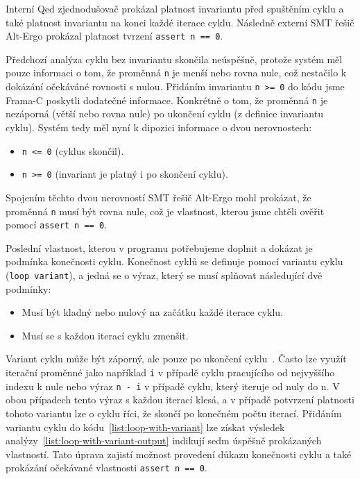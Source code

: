 Interní Qed zjednodušovač prokázal platnost invariantu před spuštěním cyklu a také platnost invariantu na konci každé iterace cyklu.
Následně externí SMT řešič Alt-Ergo prokázal platnost tvrzení \texttt{assert n == 0}.

Předchozí analýza cyklu bez invariantu skončila neúspěšně,
protože systém měl pouze informaci o tom, že proměnná \texttt{n} je menší nebo rovna nule,
což nestačilo k dokázání očekáváné rovnosti s nulou.
Přidáním invariantu \texttt{n~>=~0} do kódu jsme Frama\mbox{-}C poskytli dodatečné informace.
Konkrétně o tom, že proměnná \texttt{n} je nezáporná (větší nebo rovna nule) po ukončení cyklu (z definice invariantu cyklu).
Systém tedy měl nyní k dipozici informace o dvou nerovnostech:

\begin{itemize}
    \item \texttt{n <= 0} (cyklus skončil).
    \item \texttt{n >= 0} (invariant je platný i po skončení cyklu).
\end{itemize}

Spojením těchto dvou nerovností SMT řešič Alt-Ergo mohl prokázat,
že proměnná \texttt{n} musí být rovna nule,
což je vlastnost, kterou jsme chtěli ověřit pomocí \texttt{assert n == 0}.

Poslední vlastnost, kterou v programu potřebujeme doplnit a dokázat je podmínka konečnosti cyklu.
Konečnost cyklů se definuje pomocí variantu cyklu (\texttt{loop variant}),
a jedná se o výraz, který se musí splňovat následující dvě podmínky:

\begin{itemize}
    \item Musí být kladný nebo nulový na začátku každé iterace cyklu.
    \item Musí se s každou iterací cyklu zmenšit.
\end{itemize}

Variant cyklu může být záporný, ale pouze po ukončení cyklu~\cite{ACSLSpec}.
Často lze využít iterační proměnné jako například \texttt{i} v případě cyklu pracujícího od nejvyššího indexu k nule
nebo výraz \texttt{n - i} v případě cyklu, který iteruje od nuly do n.
V obou případech tento výraz s každou iterací klesá,
a v případě potvrzení platnosti tohoto variantu lze o cyklu říci,
že skončí po konečném počtu iterací.
Přidáním variantu cyklu do kódu~\ref{list:loop-with-variant}
lze získat výsledek analýzy~\ref{list:loop-with-variant-output} indikují sedm úspěšně prokázaných vlastností.
Tato úprava zajistí možnost provedení důkazu konečnosti cyklu
a také prokázání očekávané vlastnosti \texttt{assert~n~==~0}.

